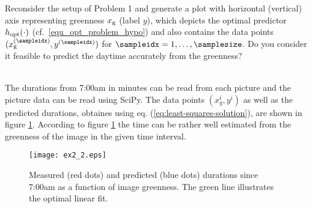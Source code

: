 \documentclass[article,11pt]{article}
\begin{document}
Reconsider the setup of Problem 1 and generate a plot with horizontal (vertical) axis representing greenness $x_{\rm g}$ (label $y$), which depicts the optimal predictor 
$h_{\rm opt}(\cdot)$ (cf.\ \eqref{equ_opt_problem_hypo}) and also contains the data points $(x_{\rm g}^{(\sampleidx)},y^{(\sampleidx)})$ for $\sampleidx=1,\ldots,\samplesize$. 
Do you consider it feasible to predict the daytime accurately from the greenness?

\\
The durations from 7:00am in minutes can be read from each picture and the
picture data can be read using SciPy. The data points $(x_g^i, y^i)$ as well as
the predicted durations, obtaines using eq. (\ref{eq:least-squares-solution}),
are shown in figure \ref{fig:linearregression}. According to figure
\ref{fig:linearregression} the time can be rather well estimated from the
greenness of the image in the given time interval.
\begin{figure}[!h]
  \centering
  \texttt{[image: ex2\_2.eps]}
  \caption{Measured (red dots) and predicted (blue dots) durations since 7:00am
    as a function of image greenness. The green line illustrates the optimal
    linear fit.}
  \label{fig:linearregression}
\end{figure}

\newpage


\newpage
\end{document}
